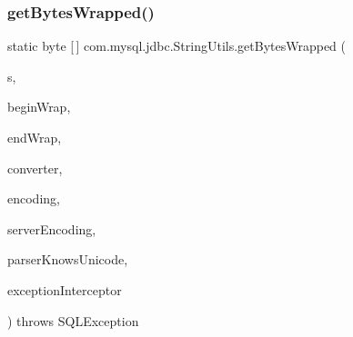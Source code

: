 \subsubsection{\texorpdfstring{get\+Bytes\+Wrapped()}{getBytesWrapped()}}
{\footnotesize\ttfamily static byte \mbox{[}$\,$\mbox{]} com.\+mysql.\+jdbc.\+String\+Utils.\+get\+Bytes\+Wrapped (\begin{DoxyParamCaption}\item[{String}]{s,  }\item[{char}]{begin\+Wrap,  }\item[{char}]{end\+Wrap,  }\item[{\mbox{\hyperlink{classcom_1_1mysql_1_1jdbc_1_1_single_byte_charset_converter}{Single\+Byte\+Charset\+Converter}}}]{converter,  }\item[{String}]{encoding,  }\item[{String}]{server\+Encoding,  }\item[{boolean}]{parser\+Knows\+Unicode,  }\item[{\mbox{\hyperlink{interfacecom_1_1mysql_1_1jdbc_1_1_exception_interceptor}{Exception\+Interceptor}}}]{exception\+Interceptor }\end{DoxyParamCaption}) throws S\+Q\+L\+Exception\hspace{0.3cm}{\ttfamily [static]}}


